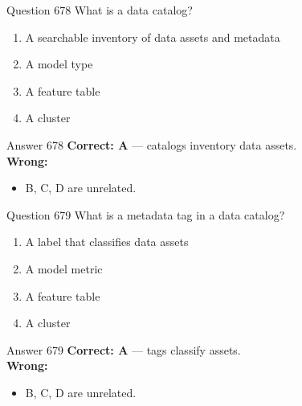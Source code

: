 \documentclass[aspectratio=169,11pt]{beamer}
\begin{document}
	\begin{frame}{Question 678}
		What is a data catalog?
		\begin{enumerate}[label=\Alph*.]
			\item A searchable inventory of data assets and metadata
			\item A model type
			\item A feature table
			\item A cluster
		\end{enumerate}
	\end{frame}
	\begin{frame}{Answer 678}
		\textbf{Correct: A} --- catalogs inventory data assets.\\
		\vspace{0.5em}
		\textbf{Wrong:}
		\begin{itemize}
			\item B, C, D are unrelated.
		\end{itemize}
	\end{frame}
	
	\begin{frame}{Question 679}
		What is a metadata tag in a data catalog?
		\begin{enumerate}[label=\Alph*.]
			\item A label that classifies data assets
			\item A model metric
			\item A feature table
			\item A cluster
		\end{enumerate}
	\end{frame}
	\begin{frame}{Answer 679}
		\textbf{Correct: A} --- tags classify assets.\\
		\vspace{0.5em}
		\textbf{Wrong:}
		\begin{itemize}
			\item B, C, D are unrelated.
		\end{itemize}
	\end{frame}
	
\end{document}
